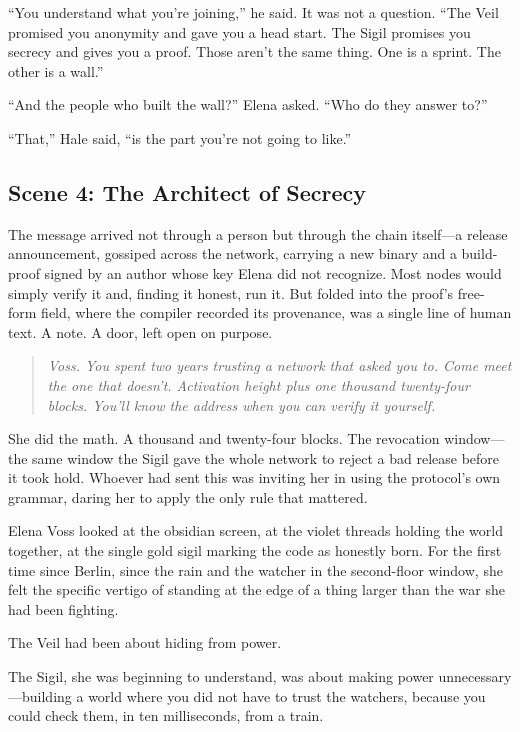 \documentclass[12pt,letterpaper]{book}
\begin{document}
``You understand what you're joining,'' he said. It was not a question. ``The Veil promised you anonymity and gave you a head start. The Sigil promises you secrecy and gives you a proof. Those aren't the same thing. One is a sprint. The other is a wall.''

``And the people who built the wall?'' Elena asked. ``Who do they answer to?''

``That,'' Hale said, ``is the part you're not going to like.''

\hypertarget{scene-4-the-architect-of-secrecy}{%
\subsection{Scene 4: The Architect of Secrecy}\label{scene-4-the-architect-of-secrecy}}

The message arrived not through a person but through the chain itself---a release announcement, gossiped across the network, carrying a new binary and a build-proof signed by an author whose key Elena did not recognize. Most nodes would simply verify it and, finding it honest, run it. But folded into the proof's free-form field, where the compiler recorded its provenance, was a single line of human text. A note. A door, left open on purpose.

\begin{quote}
\emph{Voss. You spent two years trusting a network that asked you to. Come meet the one that doesn't. Activation height plus one thousand twenty-four blocks. You'll know the address when you can verify it yourself.}
\end{quote}

She did the math. A thousand and twenty-four blocks. The revocation window---the same window the Sigil gave the whole network to reject a bad release before it took hold. Whoever had sent this was inviting her in using the protocol's own grammar, daring her to apply the only rule that mattered.

Elena Voss looked at the obsidian screen, at the violet threads holding the world together, at the single gold sigil marking the code as honestly born. For the first time since Berlin, since the rain and the watcher in the second-floor window, she felt the specific vertigo of standing at the edge of a thing larger than the war she had been fighting.

The Veil had been about hiding from power.

The Sigil, she was beginning to understand, was about making power unnecessary---building a world where you did not have to trust the watchers, because you could check them, in ten milliseconds, from a train.
\end{document}
